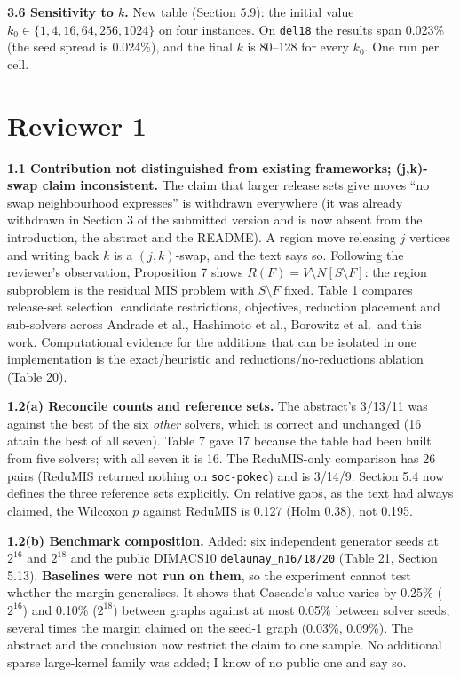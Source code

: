 \documentclass[11pt]{article}
\newcommand{\rev}[1]{\medskip\noindent\textbf{#1}}
\begin{document}
\rev{3.6 Sensitivity to $k$.}
New table (Section 5.9): the initial value $k_0\in\{1,4,16,64,256,1024\}$ on
four instances. On \texttt{del18} the results span 0.023\% (the seed spread is
0.024\%), and the final $k$ is 80--128 for every $k_0$. One run per cell.

\section*{Reviewer 1}

\rev{1.1 Contribution not distinguished from existing frameworks; (j,k)-swap
claim inconsistent.}
The claim that larger release sets give moves ``no swap neighbourhood expresses''
is withdrawn everywhere (it was already withdrawn in Section 3 of the submitted
version and is now absent from the introduction, the abstract and the README). A
region move releasing $j$ vertices and writing back $k$ is a $(j,k)$-swap, and the
text says so. Following the reviewer's observation, Proposition 7 shows
$R(F)=V\setminus N[S\setminus F]$: the region subproblem is the residual MIS
problem with $S\setminus F$ fixed. Table 1 compares release-set selection,
candidate restrictions, objectives, reduction placement and sub-solvers across
Andrade et al., Hashimoto et al., Borowitz et al.\ and this work. Computational
evidence for the additions that can be isolated in one implementation is the
exact/heuristic and reductions/no-reductions ablation (Table 20).

\rev{1.2(a) Reconcile counts and reference sets.}
The abstract's 3/13/11 was against the best of the six \emph{other} solvers, which
is correct and unchanged (16 attain the best of all seven). Table 7 gave 17 because
the table had been built from five solvers; with all seven it is 16. The
ReduMIS-only comparison has 26 pairs (ReduMIS returned nothing on
\texttt{soc-pokec}) and is 3/14/9. Section 5.4 now defines the three reference
sets explicitly. On relative gaps, as the text had always claimed, the Wilcoxon
$p$ against ReduMIS is 0.127 (Holm 0.38), not 0.195.

\rev{1.2(b) Benchmark composition.}
Added: six independent generator seeds at $2^{16}$ and $2^{18}$ and the public
DIMACS10 \texttt{delaunay\_n16/18/20} (Table 21, Section 5.13). \textbf{Baselines
were not run on them}, so the experiment cannot test whether the margin
generalises. It shows that Cascade's value varies by 0.25\% ($2^{16}$) and 0.10\%
($2^{18}$) between graphs against at most 0.05\% between solver seeds, several
times the margin claimed on the seed-1 graph (0.03\%, 0.09\%). The abstract and the
conclusion now restrict the claim to one sample. No additional sparse
large-kernel family was added; I know of no public one and say so.
\end{document}
